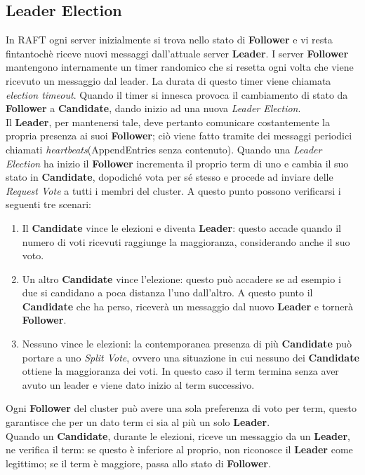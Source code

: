 \subsection{Leader Election}
\label{Leader Election}
In RAFT ogni server inizialmente si trova nello stato di \textbf{Follower} e vi resta fintantochè riceve nuovi messaggi dall'attuale server \textbf{Leader}. I server \textbf{Follower} mantengono internamente un timer randomico che si resetta ogni volta che viene ricevuto un messaggio dal leader. La durata di questo timer viene chiamata \textit{election timeout}. Quando il timer si innesca provoca il cambiamento di stato da \textbf{Follower} a \textbf{Candidate}, dando inizio ad una nuova \textit{Leader Election}.
\\ 
Il \textbf{Leader}, per mantenersi tale, deve pertanto comunicare costantemente la propria presenza ai suoi \textbf{Follower}; ciò viene fatto tramite dei messaggi periodici chiamati \textit{heartbeats}(AppendEntries senza contenuto).
Quando una \textit{Leader Election} ha inizio il \textbf{Follower} incrementa il proprio term di uno e cambia il suo stato in \textbf{Candidate}, dopodiché vota per sé stesso e procede ad inviare delle \textit{Request Vote} a tutti i membri del cluster.
A questo punto possono verificarsi i seguenti tre scenari:
\begin{enumerate}
	\item Il \textbf{Candidate} vince le elezioni e diventa \textbf{Leader}: questo accade quando il numero di voti ricevuti raggiunge la maggioranza, considerando anche il suo voto.
	\item Un altro \textbf{Candidate} vince l'elezione: questo può accadere se ad esempio i due si candidano a poca distanza l'uno dall'altro. A questo punto il \textbf{Candidate} che ha perso, riceverà un messaggio dal nuovo \textbf{Leader} e tornerà \textbf{Follower}.
	\item Nessuno vince le elezioni: la contemporanea presenza di più \textbf{Candidate} può portare a uno \textit{Split Vote}, ovvero una situazione in cui nessuno dei \textbf{Candidate} ottiene la maggioranza dei voti. In questo caso il term termina senza aver avuto un leader e viene dato inizio al term successivo.
\end{enumerate}
Ogni \textbf{Follower} del cluster può avere una sola preferenza di voto per term, questo garantisce che per un dato term ci sia al più un solo \textbf{Leader}. \\
Quando un \textbf{Candidate}, durante le elezioni, riceve un messaggio da un \textbf{Leader}, ne verifica il term: se questo è inferiore al proprio, non riconosce il \textbf{Leader} come legittimo; se il term è maggiore, passa allo stato di \textbf{Follower}.

